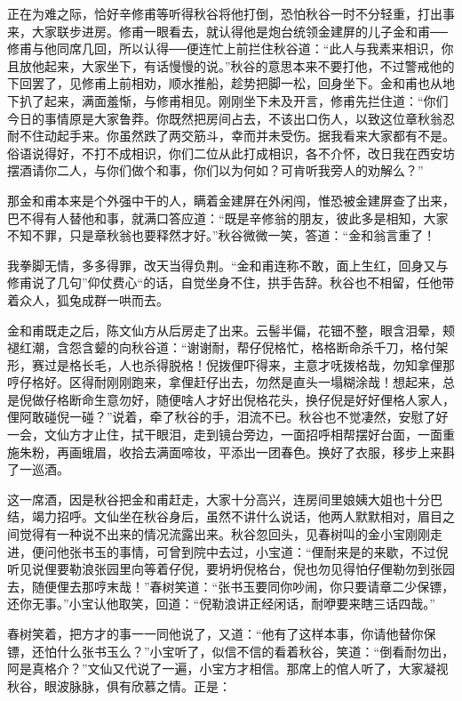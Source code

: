 \documentclass[12pt,UTF8]{ctexbook}
\begin{document}
{{{正在为难之际，恰好辛修甫等听得秋谷将他打倒，恐怕秋谷一时不分轻重，打出事来，大家联步进房。修甫一眼看去，就认得他是炮台统领金建屏的儿子金和甫──修甫与他同席几回，所以认得──便连忙上前拦住秋谷道：“此人与我素来相识，你且放他起来，大家坐下，有话慢慢的说。”秋谷的意思本来不要打他，不过警戒他的下回罢了，见修甫上前相劝，顺水推船，趁势把脚一松，回身坐下。金和甫也从地下扒了起来，满面羞惭，与修甫相见。刚刚坐下未及开言，修甫先拦住道：“你们今日的事情原是大家鲁莽。你既然把房间占去，不该出口伤人，以致这位章秋翁忍耐不住动起手来。你虽然跌了两交筋斗，幸而并未受伤。据我看来大家都有不是。俗语说得好，不打不成相识，你们二位从此打成相识，各不介怀，改日我在西安坊摆酒请你二人，与你们做个和事，你们以为何如？可肯听我旁人的劝解么？”

那金和甫本来是个外强中干的人，瞒着金建屏在外闲闯，惟恐被金建屏查了出来，巴不得有人替他和事，就满口答应道：“既是辛修翁的朋友，彼此多是相知，大家不知不罪，只是章秋翁也要释然才好。”秋谷微微一笑，答道：“金和翁言重了！

我拳脚无情，多多得罪，改天当得负荆。“金和甫连称不敢，面上生红，回身又与修甫说了几句”仰仗费心“的话，自觉坐身不住，拱手告辞。秋谷也不相留，任他带着众人，狐兔成群一哄而去。

金和甫既走之后，陈文仙方从后房走了出来。云髻半偏，花钿不整，眼含泪晕，颊褪红潮，含怨含颦的向秋谷道：“谢谢耐，帮仔倪格忙，格格断命杀千刀，格付架形，赛过是格长毛，人也杀得脱格！倪拨俚吓得来，主意才呒拨格哉，勿知拿俚那哼仔格好。区得耐刚刚跑来，拿俚赶仔出去，勿然是直头一塌糊涂哉！想起来，总是倪做仔格断命生意勿好，随便啥人才好出倪格花头，换仔倪是好好俚格人家人，俚阿敢碰倪一碰？”说着，牵了秋谷的手，泪流不已。秋谷也不觉凄然，安慰了好一会，文仙方才止住，拭干眼泪，走到镜台旁边，一面招呼相帮摆好台面，一面重施朱粉，再画蛾眉，收拾去满面啼妆，平添出一团春色。换好了衣服，移步上来斟了一巡酒。

这一席酒，因是秋谷把金和甫赶走，大家十分高兴，连房间里娘姨大姐也十分巴结，竭力招呼。文仙坐在秋谷身后，虽然不讲什么说话，他两人默默相对，眉目之间觉得有一种说不出来的情况流露出来。秋谷忽回头，见春树叫的金小宝刚刚走进，便问他张书玉的事情，可曾到院中去过，小宝道：“俚耐来是的来歇，不过倪听见说俚要勒浪张园里向等着仔倪，要坍坍倪格台，倪也勿见得怕仔俚勒勿到张园去，随便俚去那哼末哉！”春树笑道：“张书玉要同你吵闹，你只要请章二少保镖，还你无事。”小宝认他取笑，回道：“倪勒浪讲正经闲话，耐咿要来瞎三话四哉。”

春树笑着，把方才的事一一同他说了，又道：“他有了这样本事，你请他替你保镖，还怕什么张书玉么？”小宝听了，似信不信的看着秋谷，笑道：“倒看耐勿出，阿是真格介？”文仙又代说了一遍，小宝方才相信。那席上的倌人听了，大家凝视秋谷，眼波脉脉，俱有欣慕之情。正是：

}}}
\end{document}
